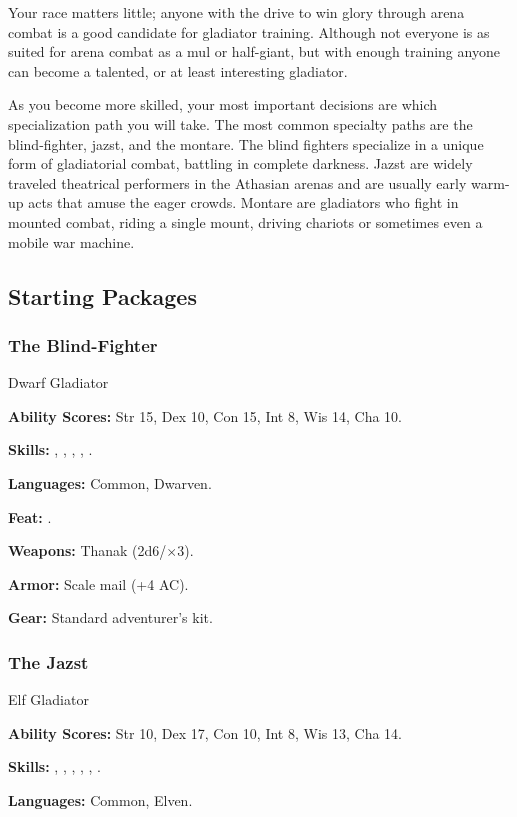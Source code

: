 Your race matters little; anyone with the drive to win glory through arena combat is a good candidate for gladiator training. Although not everyone is as suited for arena combat as a mul or half-giant, but with enough training anyone can become a talented, or at least interesting gladiator.

As you become more skilled, your most important decisions are which specialization path you will take. The most common specialty paths are the blind-fighter, jazst, and the montare. The blind fighters specialize in a unique form of gladiatorial combat, battling in complete darkness. Jazst are widely traveled theatrical performers in the Athasian arenas and are usually early warm-up acts that amuse the eager crowds. Montare are gladiators who fight in mounted combat, riding a single mount, driving chariots or sometimes even a mobile war machine.

\subsection{Starting Packages}
\subsubsection{The Blind-Fighter}
Dwarf Gladiator

\textbf{Ability Scores:} Str 15, Dex 10, Con 15, Int 8, Wis 14, Cha 10.

\textbf{Skills:} , , , , .

\textbf{Languages:} Common, Dwarven.

\textbf{Feat:} .

\textbf{Weapons:} Thanak (2d6/$\times$3).

\textbf{Armor:} Scale mail (+4 AC).

\textbf{Gear:} Standard adventurer's kit.

\subsubsection{The Jazst}
Elf Gladiator

\textbf{Ability Scores:} Str 10, Dex 17, Con 10, Int 8, Wis 13, Cha 14.

\textbf{Skills:} , , , , , .

\textbf{Languages:} Common, Elven.

